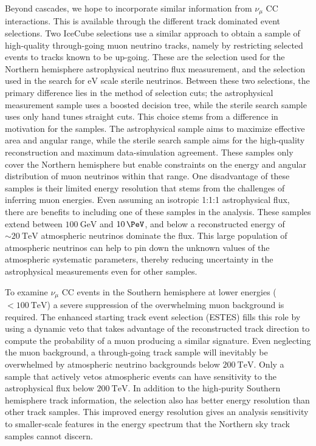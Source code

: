 Beyond cascades, we hope to incorporate similar information from $\nu_\mu$ CC interactions.
This is available through the different track dominated event selections.
Two IceCube selections use a similar approach to obtain a sample of high-quality through-going muon neutrino tracks, namely by restricting selected events to tracks known to be up-going.
These are the selection used for the Northern hemisphere astrophysical neutrino flux measurement, and the selection used in the search for $\si\eV$ scale sterile neutrinos.
Between these two selections, the primary difference lies in the method of selection cuts; the astrophysical measurement sample uses a boosted decision tree, while the sterile search sample uses only hand tunes straight cuts.
This choice stems from a difference in motivation for the samples.
The astrophysical sample aims to maximize effective area and angular range, while the sterile search sample aims for the high-quality reconstruction and maximum data-simulation agreement.
These samples only cover the Northern hemisphere but enable constraints on the energy and angular distribution of muon neutrinos within that range.
One disadvantage of these samples is their limited energy resolution that stems from the challenges of inferring muon energies.
Even assuming an isotropic 1:1:1 astrophysical flux, there are benefits to including one of these samples in the analysis.
These samples extend between $\SI{100}\GeV$ and $\SI{10}\PeV$, and below a reconstructed energy of $\sim\SI{20}\TeV$ atmospheric neutrinos dominate the flux.
This large population of atmospheric neutrinos can help to pin down the unknown values of the atmospheric systematic parameters, thereby reducing uncertainty in the astrophysical measurements even for other samples.

To examine $\nu_\mu$ CC events in the Southern hemisphere at lower energies ($<\SI{100}\TeV$) a severe suppression of the overwhelming muon background is required.
The enhanced starting track event selection (ESTES) fills this role by using a dynamic veto that takes advantage of the reconstructed track direction to compute the probability of a muon producing a similar signature.
Even neglecting the muon background, a through-going track sample will inevitably be overwhelmed by atmospheric neutrino backgrounds below $\SI{200}\TeV$.
Only a sample that actively vetos atmospheric events can have sensitivity to the astrophysical flux below $\SI{200}\TeV$.
In addition to the high-purity Southern hemisphere track information, the selection also has better energy resolution than other track samples.
This improved energy resolution gives an analysis sensitivity to smaller-scale features in the energy spectrum that the Northern sky track samples cannot discern.

